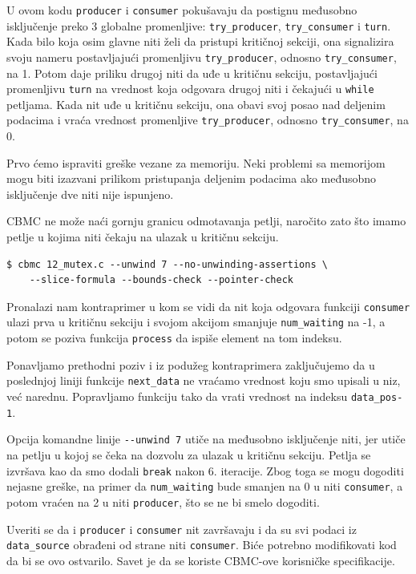U ovom kodu \texttt{producer} i \texttt{consumer} pokušavaju da postignu međusobno isključenje preko 3 globalne promenljive: \texttt{try\_producer}, \texttt{try\_consumer} i \texttt{turn}. Kada bilo koja osim glavne niti želi da pristupi kritičnoj sekciji, ona signalizira svoju nameru postavljajući promenljivu \texttt{try\_producer}, odnosno \texttt{try\_consumer}, na 1. Potom daje priliku drugoj niti da uđe u kritičnu sekciju, postavljajući promenljivu \texttt{turn} na vrednost koja odgovara drugoj niti i čekajući u \texttt{while} petljama. Kada nit uđe u kritičnu sekciju, ona obavi svoj posao nad deljenim podacima i vraća vrednost promenljive \texttt{try\_producer}, odnosno \texttt{try\_consumer}, na 0.

Prvo ćemo ispraviti greške vezane za memoriju. Neki problemi sa memorijom mogu biti izazvani prilikom pristupanja deljenim podacima ako međusobno isključenje dve niti nije ispunjeno.

CBMC ne može naći gornju granicu odmotavanja petlji, naročito zato što imamo petlje u kojima niti čekaju na ulazak u kritičnu sekciju.

\begin{verbatim}
$ cbmc 12_mutex.c --unwind 7 --no-unwinding-assertions \
    --slice-formula --bounds-check --pointer-check
\end{verbatim}

Pronalazi nam kontraprimer u kom se vidi da nit koja odgovara funkciji \texttt{consumer} ulazi prva u kritičnu sekciju i svojom akcijom smanjuje \texttt{num\_waiting} na -1, a potom se poziva funkcija \texttt{process} da ispiše element na tom indeksu.

Ponavljamo prethodni poziv i iz podužeg kontraprimera zaključujemo da u poslednjoj liniji funkcije \texttt{next\_data} ne vraćamo vrednost koju smo upisali u niz, već narednu. Popravljamo funkciju tako da vrati vrednost na indeksu \texttt{data\_pos-1}.

Opcija komandne linije \texttt{-{}-unwind\ 7} utiče na međusobno isključenje niti, jer utiče na petlju u kojoj se čeka na dozvolu za ulazak u kritičnu sekciju. Petlja se izvršava kao da smo dodali \texttt{break} nakon 6. iteracije. Zbog toga se mogu dogoditi nejasne greške, na primer da \texttt{num\_waiting} bude smanjen na 0 u niti \texttt{consumer}, a potom vraćen na 2 u niti \texttt{producer}, što se ne bi smelo dogoditi.

Uveriti se da i \texttt{producer} i \texttt{consumer} nit završavaju i da su svi podaci iz \texttt{data\_source} obrađeni od strane niti \texttt{consumer}. Biće potrebno modifikovati kod da bi se ovo ostvarilo. Savet je da se koriste CBMC-ove korisničke specifikacije.

